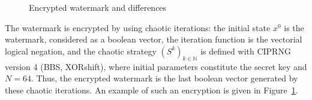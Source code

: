 \begin{figure}[!t]
\centering
{}
\hfil
{}
\caption{Encrypted watermark and differences}
\label{Encrypted watermark and differences}
\end{figure}

The watermark is encrypted by using chaotic iterations: the initial state $x^{0}$ is the watermark, considered as a boolean vector, the iteration function is the vectorial logical negation, and the chaotic strategy $(S^{k})_{k\in \mathds{N}}$ is defined with CIPRNG version 4 (BBS, XORshift), where initial parameters constitute the secret key and $N=64$. Thus, the encrypted watermark is the last boolean vector generated by these chaotic iterations. An example of such an encryption is given in Figure~\ref{Encrypted watermark and differences}.


